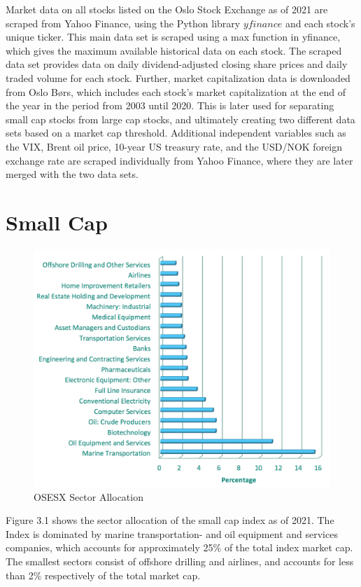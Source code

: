 Market data on all stocks listed on the Oslo Stock Exchange as of 2021 are scraped from Yahoo Finance, using the Python library $\textit{yfinance}$ and each stock's unique ticker. This main data set is scraped using a max function in yfinance, which gives the maximum available historical data on each stock. The scraped data set provides data on daily dividend-adjusted closing share prices and daily traded volume for each stock. Further, market capitalization data is downloaded from Oslo Børs, which includes each stock's market capitalization at the end of the year in the period from 2003 until 2020. This is later used for separating small cap stocks from large cap stocks, and ultimately creating two different data sets based on a market cap threshold. Additional independent variables such as the VIX, Brent oil price, 10-year US treasury rate, and the USD/NOK foreign exchange rate are scraped individually from Yahoo Finance, where they are later merged with the two data sets. 

\section{Small Cap}
\begin{figure}[H]
\centering
\includegraphics [scale=0.44,angle=360]{figures/smallsector.png}
\caption{OSESX Sector Allocation \cite{euronext}}
\label{fig:smallsector}
\end{figure}
\indent\newline 
Figure 3.1 shows the sector allocation of the small cap index as of 2021. The Index is dominated by marine transportation- and oil equipment and services companies, which accounts for approximately 25\% of the total index market cap. The smallest sectors consist of offshore drilling and airlines, and accounts for less than 2\% respectively of the total market cap. 


